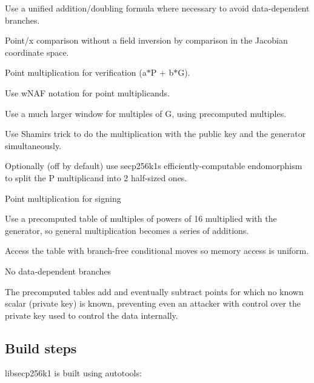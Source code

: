 \begin{DoxyItemize}
\begin{DoxyItemize}
\item Use a unified addition/doubling formula where necessary to avoid data-\/dependent branches.
\item Point/x comparison without a field inversion by comparison in the Jacobian coordinate space.
\end{DoxyItemize}
\item Point multiplication for verification (a$\ast$\+P + b$\ast$\+G).
\begin{DoxyItemize}
\item Use w\+N\+A\+F notation for point multiplicands.
\item Use a much larger window for multiples of G, using precomputed multiples.
\item Use Shamir\textquotesingle{}s trick to do the multiplication with the public key and the generator simultaneously.
\item Optionally (off by default) use secp256k1\textquotesingle{}s efficiently-\/computable endomorphism to split the P multiplicand into 2 half-\/sized ones.
\end{DoxyItemize}
\item Point multiplication for signing
\begin{DoxyItemize}
\item Use a precomputed table of multiples of powers of 16 multiplied with the generator, so general multiplication becomes a series of additions.
\item Access the table with branch-\/free conditional moves so memory access is uniform.
\item No data-\/dependent branches
\item The precomputed tables add and eventually subtract points for which no known scalar (private key) is known, preventing even an attacker with control over the private key used to control the data internally.
\end{DoxyItemize}
\end{DoxyItemize}

\subsection*{Build steps }

libsecp256k1 is built using autotools\+: 
 